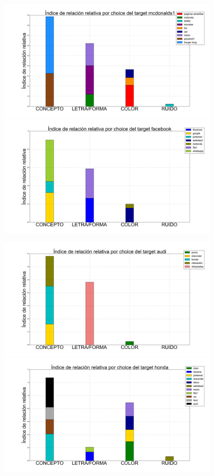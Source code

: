 \documentclass{beamer}
\begin{document}
\begin{frame}
\begin{figure}[h]
 \centering
  \begin{minipage}[c]{1\textwidth}
	\includegraphics[scale=0.108]{mcdonalds1.png}
	\includegraphics[scale=0.108]{facebook.png}
  \end{minipage}
  \begin{minipage}[c]{1\textwidth}
	\includegraphics[scale=0.108]{audi.png}
	\includegraphics[scale=0.108]{honda.png}

\end{minipage}
\end{figure}
\end{frame}
\end{document}
